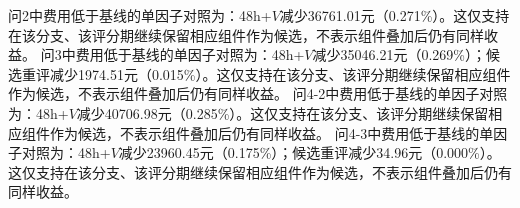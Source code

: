 问2中费用低于基线的单因子对照为：48h+$V$减少36761.01元（0.271\%）。这仅支持在该分支、该评分期继续保留相应组件作为候选，不表示组件叠加后仍有同样收益。
问3中费用低于基线的单因子对照为：48h+$V$减少35046.21元（0.269\%）；候选重评减少1974.51元（0.015\%）。这仅支持在该分支、该评分期继续保留相应组件作为候选，不表示组件叠加后仍有同样收益。
问4-2中费用低于基线的单因子对照为：48h+$V$减少40706.98元（0.285\%）。这仅支持在该分支、该评分期继续保留相应组件作为候选，不表示组件叠加后仍有同样收益。
问4-3中费用低于基线的单因子对照为：48h+$V$减少23960.45元（0.175\%）；候选重评减少34.96元（0.000\%）。这仅支持在该分支、该评分期继续保留相应组件作为候选，不表示组件叠加后仍有同样收益。